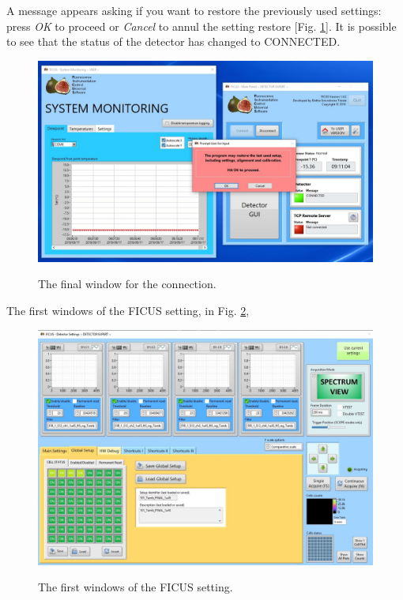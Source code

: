 \documentclass[a4paper,12pt,oneside,pdflatex,italian,final,twocolumn]{article}
\begin{document}
A message appears asking if you want to restore the previously used settings: press \textit{OK} to proceed or \textit{Cancel} to annul the setting restore [Fig. \ref{fig:fig6}]. It is possible to see that the status of the detector has changed to CONNECTED.

\begin{figure}[h]
\centering
{\includegraphics[width=.95\textwidth]{Capture4.jpg}} \quad
\caption{The final window for the connection.}\label{fig:fig6}
\end{figure}

The first windows of the FICUS setting, in Fig. \ref{fig:fig7}, 

\begin{figure}[h]
\centering
{\includegraphics[width=.95\textwidth]{Capture8.jpg}} \quad
\caption{The first windows of the FICUS setting.}\label{fig:fig7}
\end{figure}
\end{document}
